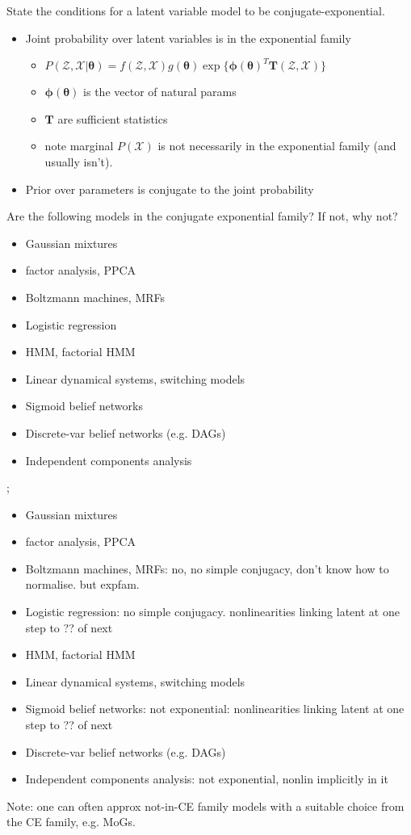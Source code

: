 \documentclass{article}
\begin{document}
State the conditions for a latent variable model to be conjugate-exponential. \begin{itemize}
    \item Joint probability over latent variables is in the exponential family
    \begin{itemize}
        \item $P(\mathcal{Z, X}|\bm{\theta}) = f(\mathcal{Z, X})g(\bm{\theta})\exp\{\bm{\phi(\theta)}^T\bm{T}(\mathcal{Z,X})\}$
        \item $\bm{\phi(\theta)}$ is the vector of natural params
        \item $\bm{T}$ are sufficient statistics
        \item note marginal $P(\mathcal{X})$ is not necessarily in the exponential family (and usually isn't).
    \end{itemize}
    \item Prior over parameters is conjugate to the joint probability
\end{itemize}

Are the following models in the conjugate exponential family? If not, why not? 
\begin{itemize}
    \item Gaussian mixtures
    \item factor analysis, PPCA
    \item Boltzmann machines, MRFs
    \item Logistic regression
    \item HMM, factorial HMM
    \item Linear dynamical systems, switching models
    \item Sigmoid belief networks
    \item Discrete-var belief networks (e.g. DAGs)
    \item Independent components analysis
\end{itemize}; \begin{itemize}
    \item Gaussian mixtures
    \item factor analysis, PPCA
    \item Boltzmann machines, MRFs: no, no simple conjugacy, don't know how to normalise. but expfam.
    \item Logistic regression: no simple conjugacy. nonlinearities linking latent at one step to ?? of next
    \item HMM, factorial HMM
    \item Linear dynamical systems, switching models
    \item Sigmoid belief networks: not exponential: nonlinearities linking latent at one step to ?? of next
    \item Discrete-var belief networks (e.g. DAGs)
    \item Independent components analysis: not exponential, nonlin implicitly in it
\end{itemize} Note: one can often approx not-in-CE family models with a suitable choice from the CE family, e.g. MoGs.
\end{document}
